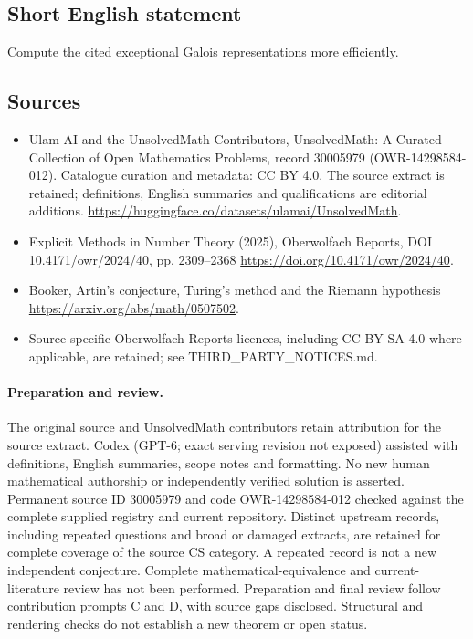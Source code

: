\documentclass[11pt]{article}
\begin{document}
\subsection{Short English statement}
Compute the cited exceptional Galois representations more efficiently.
\subsection{Sources}
\begin{itemize}
\item[\hypertarget{source:30005979:1}{S1}] Ulam AI and the UnsolvedMath Contributors, UnsolvedMath: A Curated Collection of Open Mathematics Problems, record 30005979 (OWR-14298584-012). Catalogue curation and metadata: CC BY 4.0. The source extract is retained; definitions, English summaries and qualifications are editorial additions.
\url{https://huggingface.co/datasets/ulamai/UnsolvedMath}.
\item[\hypertarget{source:30005979:2}{S2}] Explicit Methods in Number Theory (2025), Oberwolfach Reports, DOI 10.4171/owr/2024/40, pp. 2309--2368
\url{https://doi.org/10.4171/owr/2024/40}.
\item[\hypertarget{source:30005979:3}{S3}] Booker, Artin's conjecture, Turing's method and the Riemann hypothesis
\url{https://arxiv.org/abs/math/0507502}.
\item Source-specific Oberwolfach Reports licences, including CC BY-SA 4.0 where applicable, are retained; see THIRD\_PARTY\_NOTICES.md.
\end{itemize}
\paragraph{Preparation and review.}
The original source and UnsolvedMath contributors retain attribution for the source extract. Codex (GPT-6; exact serving revision not exposed) assisted with definitions, English summaries, scope notes and formatting. No new human mathematical authorship or independently verified solution is asserted. Permanent source ID 30005979 and code OWR-14298584-012 checked against the complete supplied registry and current repository. Distinct upstream records, including repeated questions and broad or damaged extracts, are retained for complete coverage of the source CS category. A repeated record is not a new independent conjecture. Complete mathematical-equivalence and current-literature review has not been performed. Preparation and final review follow contribution prompts C and D, with source gaps disclosed. Structural and rendering checks do not establish a new theorem or open status.
\label{end:30005979}
\end{document}
